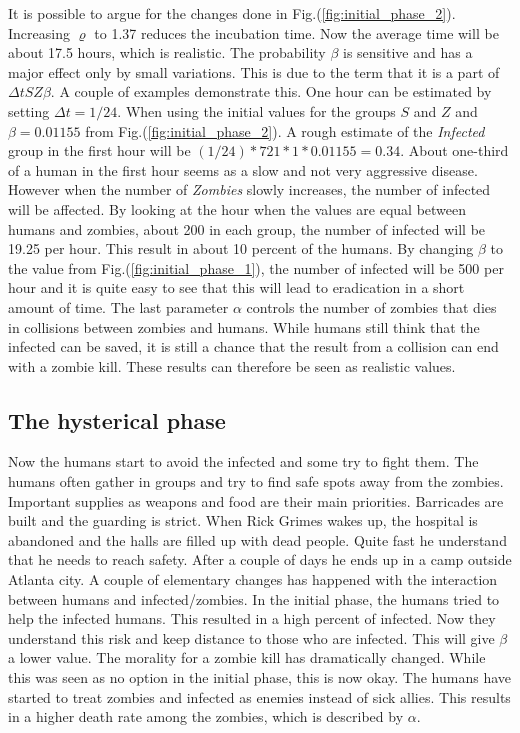\documentclass[%
twoside,                 %
final,                   %
chapterprefix=true,      %
open=right               %
10pt]{book}
\begin{document}
It is possible to argue for the changes done in Fig.(\ref{fig:initial_phase_2}). Increasing $\varrho$ to 1.37 reduces the incubation time. Now the average time will be about 17.5 hours, which is realistic. The probability $\beta$ is sensitive and has a major effect only by small variations. This is due to the term that it is a part of $\Delta t SZ \beta$. A couple of examples demonstrate this. One hour can be estimated by setting $\Delta t = 1/24$. When using the initial values for the groups $S$ and $Z$ and $\beta=0.01155$ from Fig.(\ref{fig:initial_phase_2}). A rough estimate of the \emph{Infected} group in the first hour will be $(1/24)*721*1*0.01155=0.34$. About one-third of a human in the first hour seems as a slow and not very aggressive disease. However when the number of \emph{Zombies} slowly increases, the number of infected will be affected. By looking at the hour when the values are equal between humans and zombies, about 200 in each group, the number of infected will be 19.25 per hour. This result in about 10 percent of the humans. By changing $\beta$ to the value from Fig.(\ref{fig:initial_phase_1}), the number of infected will be 500 per hour and it is quite easy to see that this will lead to eradication in a short amount of time. The last parameter $\alpha$ controls the number of zombies that dies in collisions between zombies and humans. While humans still think that the infected can be saved, it is still a chance that the result from a collision can end with a zombie kill. These results can therefore be seen as realistic values.

\subsection{The hysterical phase}
Now the humans start to avoid the infected and some try to fight them. The humans often gather in groups and try to find safe spots away from the zombies. Important supplies as weapons and food are their main priorities. Barricades are built and the guarding is strict. When Rick Grimes wakes up, the hospital is abandoned and the halls are filled up with dead people. Quite fast he understand that he needs to reach safety. After a couple of days he ends up in a camp outside Atlanta city. A couple of elementary changes has happened with the interaction between humans and infected/zombies. In the initial phase, the humans tried to help the infected humans. This resulted in a high percent of infected. Now they understand this risk and keep distance to those who are infected. This will give $\beta$ a lower value. The morality for a zombie kill has dramatically changed. While this was seen as no option in the initial phase, this is now okay. The humans have started to treat zombies and infected as enemies instead of sick allies. This results in a higher death rate among the zombies, which is described by $\alpha$. 
\end{document}
